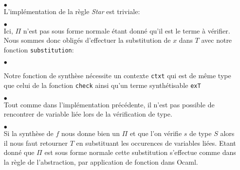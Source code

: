 \documentclass {article}
\newcommand{\codefrom}[3]
           {}
\theoremstyle{definition}
\theoremstyle{remark}
\newcommand{\fun}[1]{\lstinline!#1!}
\begin{document}
\begin{itemize}
         
\item[$\bullet$] \\    

  L'implémentation de la règle \emph{Star} est triviale:
  
  \codefrom{dependent}{lambda}{check_star}

    
\item[$\bullet$] \\    
  
  Ici,  $\Pi$ n'est pas sous forme normale étant donné qu'il est le terme
  à vérifier. Nous sommes donc obligés d'effectuer la substitution de $x$ dans $T$
  avec notre fonction \fun{substitution}:
  
\codefrom{dependent}{lambda}{check_pi}

\item[$\bullet$] 

Notre fonction de synthèse nécessite un contexte \fun{ctxt} qui est de même type que celui de la fonction
\fun{check} ainsi qu'un terme synthétisable \fun{exT}

    \codefrom{dependent}{lambda}{synth_head}

\item[$\bullet$] \\    

  Tout comme dans l'implémentation précédente, il n'est pas possible de rencontrer de variable 
  liée lors de la vérification de type. 

  \codefrom{dependent}{lambda}{synth_var}


\item[$\bullet$] \\    

  Si la synthèse de $f$ nous donne bien un $\Pi$ et que l'on vérifie $s$ de type
  $S$ alors il nous faut retourner $T$ en substituant les occurences de variables liées.  
  Etant donné que $\Pi$ est sous forme normale cette substitution s'effectue
  comme dans la règle de l'abstraction, par application de fonction dans Ocaml.
  
  \codefrom{dependent}{lambda}{synth_app}



\end{itemize}
\end{document}
